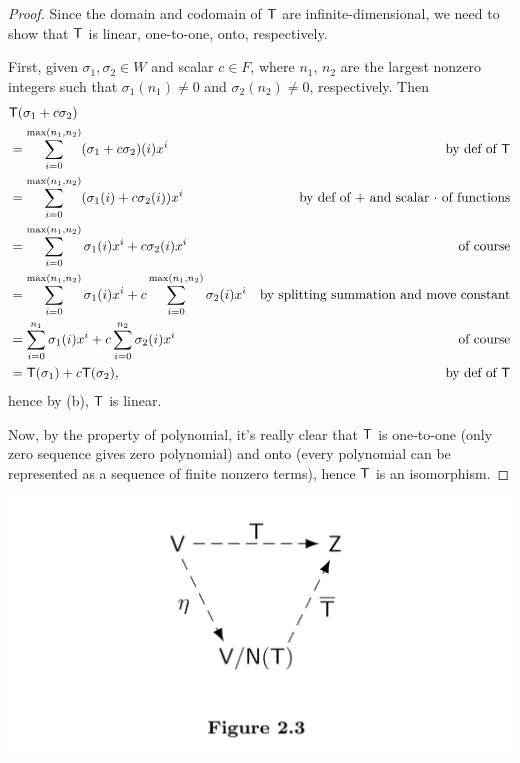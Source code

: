 \begin{proof}
Since the domain and codomain of \(\textsf{T}\) are infinite-dimensional, we need to show that \(\textsf{T}\) is linear, one-to-one, onto, respectively.

First, given \(\sigma_1, \sigma_2 \in W\) and scalar \(c \in F\), where \(n_1\), \(n_2\) are the largest nonzero integers such that \(\sigma_1(n_1) \ne 0\) and \(\sigma_2(n_2) \ne 0\), respectively.
Then
\begin{align*}
    & \textsf{T}(\sigma_1 + c \sigma_2) \\
    & = \sum_{i = 0}^{\max(n_1, n_2)} (\sigma_1 + c \sigma_2)(i) x^i & \text{by def of \(\textsf{T}\)} \\
    & = \sum_{i = 0}^{\max(n_1, n_2)} (\sigma_1(i) + c \sigma_2(i)) x^i & \text{by def of \(+\) and scalar \(\cdot\) of functions} \\
    & = \sum_{i = 0}^{\max(n_1, n_2)} \sigma_1(i) x^i + c \sigma_2(i) x^i & \text{of course} \\
    & = \sum_{i = 0}^{\max(n_1, n_2)} \sigma_1(i) x^i + c \sum_{i = 0}^{\max(n_1, n_2)} \sigma_2(i) x^i & \text{by splitting summation and move constant} \\
    & = \sum_{i = 0}^{n_1} \sigma_1(i) x^i + c \sum_{i = 0}^{n_2} \sigma_2(i) x^i & \text{of course} \\
    & = \textsf{T}(\sigma_1) + c\textsf{T}(\sigma_2), & \text{by def of \(\textsf{T}\)}
\end{align*}
hence by (b), \(\textsf{T}\) is linear.

Now, by the property of polynomial, it's really clear that \(\textsf{T}\) is one-to-one (only zero sequence gives zero polynomial) and onto (every polynomial can be represented as a sequence of finite nonzero terms), hence \(\textsf{T}\) is an isomorphism.
\end{proof}

\includegraphics[width=16cm]{images/figure-2-3.png}

